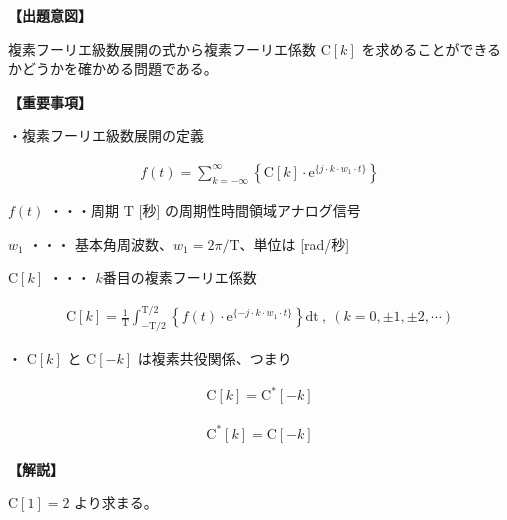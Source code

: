 \noindent \textbf{【出題意図】}

\bigskip
\noindent 複素フーリエ級数展開の式から複素フーリエ係数 $\textrm{C}[k]$ を求めることができるかどうかを確かめる問題である。

\vspace{1em}
\noindent \textbf{【重要事項】}

\medskip
\noindent ・複素フーリエ級数展開の定義

\begin{align*}
f(t) = \sum_{k = -\infty}^{\infty} 
\left \{
\textrm{C}[k] \cdot \textrm{e}^{\{j \cdot k \cdot w_1 \cdot t \}}
\right \}
\end{align*}

\medskip
\noindent $f(t)$ ・・・周期 $\textrm{T}$ [秒] の周期性時間領域アナログ信号

\medskip
\noindent $w_1$ ・・・ 基本角周波数、$w_1 = 2\pi/\textrm{T}$、単位は [rad/秒]

\medskip
\noindent $\textrm{C}[k]$ ・・・ $k$番目の複素フーリエ係数

\begin{align*}
\textrm{C}[k] = \frac{1}{\textrm{T}} \int_{-\textrm{T}/2}^{\textrm{T}/2} 
\left \{
f(t) \cdot \textrm{e}^{\{-j \cdot k \cdot w_1 \cdot t \}} 
\right \}
\textrm{dt}
\ ,\  (k = 0, \pm 1, \pm 2, \cdots)
\end{align*}

\bigskip
\noindent ・ $\textrm{C}[k]$ と $\textrm{C}[-k]$ は複素共役関係、つまり

\begin{align*}
\textrm{C}[k] = \textrm{C}^{*}[-k]
\end{align*}

\begin{align*}
\textrm{C}^{*}[k] = \textrm{C}[-k]
\end{align*}

\bigskip

\vspace{1em}
\noindent \textbf{【解説】}

\bigskip
\noindent $\textrm{C}[1] = 2$ より求まる。
